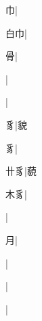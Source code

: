 \begin{multicols}{2}
{{\cjk{}{\cnsym{}　}{\cnsym{}　}巾}|{}\par
{\cjk{}{\cnsym{}　}白巾}|{}\par
{\cjk{}{\cnsym{}　}{\cnsym{}　}骨}|{}\par
{}|{}\par
{}|{}\par
{\cjk{}{\cnsym{}　}{\cnsym{}　}豸}|{\cjk{}貌}\par
{豸}|{}\par
{\cjk{}{\cnsym{}　}卄豸}|{\cjk{}藐}\par
{\cjk{}{\cnsym{}　}木豸}|{}\par
{}|{}\par
{\cjk{}{\cnsym{}　}{\cnsym{}　}月}|{}\par
{}|{}\par
{}|{}\par
{}|{}\par
}
\end{multicols}
